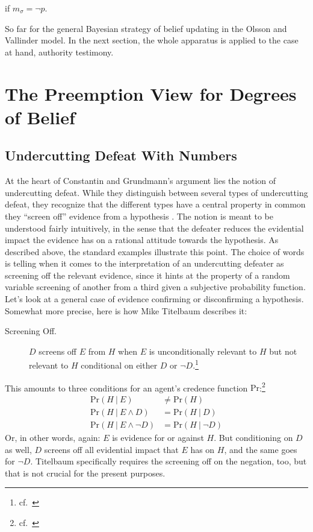 \documentclass[11pt, a4paper]{scrartcl}
\newcommand{\given}[1][]{\:#1\vert\:}
\renewcommand{\Pr}{\text{Pr}}
\begin{document}
if $m_\sigma = \neg p$. 

So far for the general Bayesian strategy of belief updating in the Olsson and Vallinder model. In the next section, the whole apparatus is applied to the case at hand, authority testimony. 

\section{The Preemption View for Degrees of Belief}

\subsection{Undercutting Defeat With Numbers}

At the heart of Constantin and Grundmann's argument lies the notion of undercutting defeat. While they distinguish between several types of undercutting defeat, they recognize that the different types have a central property in common they ``screen off'' evidence from a hypothesis \parencite[fn. 18]{Constantin2017}. The notion is meant to be understood fairly intuitively, in the sense that the defeater reduces the evidential impact the evidence has on a rational attitude towards the hypothesis. As described above, the standard examples illustrate this point. The choice of words is telling when it comes to the interpretation of an undercutting defeater as screening off the relevant evidence, since it hints at the property of a random variable screening of another from a third given a subjective probability function. Let's look at a general case of evidence confirming or disconfirming a hypothesis. Somewhat more precise, here is how Mike Titelbaum describes it:

\begin{description}
    \item[Screening Off.] $D$ screens off $E$ from $H$ when $E$ is unconditionally relevant to $H$ but not relevant to $H$ conditional on either $D$ or $\neg D$.\footnote{cf.\ \textcite[270]{Titelbaum2017}}
\end{description}

This amounts to three conditions for an agent's credence function $\Pr$:\footnote{cf.\ \textcite[70]{Titelbaum2017}}
\begin{align*}
    \Pr(H \given E) &\not = \Pr(H)\\
    \Pr(H \given E \land D) &= \Pr(H \given D)\\
    \Pr(H \given E \land \neg D) &= \Pr(H \given \neg D)
\end{align*} Or, in other words, again: $E$ is evidence for or against $H$. But conditioning on $D$ as well, $D$ screens off all evidential impact that $E$ has on $H$, and the same goes for $\neg D$. Titelbaum specifically requires the screening off on the negation, too, but that is not crucial for the present purposes.
\end{document}
